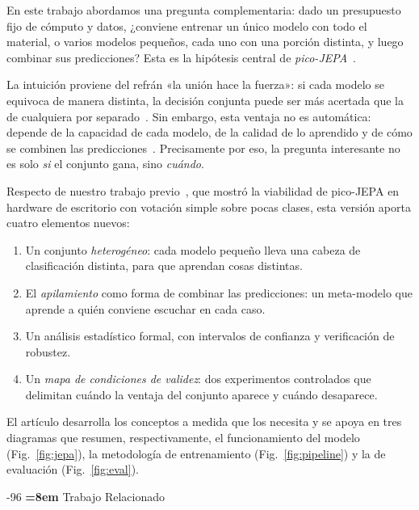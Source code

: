 \documentclass[runningheads]{llncs}
\makeatletter
\renewcommand\section{\@startsection{section}{1}{\z@}%
   {-9\p@ \@plus -2\p@ \@minus -2\p@}{6\p@ \@plus 2\p@ \@minus 2\p@}%
   {\normalfont\large\bfseries\boldmath\rightskip=\z@ \@plus 8em\pretolerance=10000 }}
\makeatother
\begin{document}
En este trabajo abordamos una pregunta complementaria: dado un presupuesto fijo
de cómputo y datos, ¿conviene entrenar un único modelo con todo el material, o
varios modelos pequeños, cada uno con una porción distinta, y luego combinar sus
predicciones? Esta es la hipótesis central de
\emph{pico-JEPA}~\cite{rostagno2025pico}.

La intuición proviene del refrán «la unión hace la fuerza»: si cada modelo se
equivoca de manera distinta, la decisión conjunta puede ser más acertada que la
de cualquiera por
separado~\cite{dietterich2000ensemble,lakshminarayanan2017simple}. Sin embargo,
esta ventaja no es automática: depende de la capacidad de cada modelo, de la
calidad de lo aprendido y de cómo se combinen las
predicciones~\cite{wenzel2020hyperparameter}. Precisamente por eso, la pregunta
interesante no es solo \emph{si} el conjunto gana, sino \emph{cuándo}.

Respecto de nuestro trabajo previo~\cite{rostagno2025pico}, que mostró la
viabilidad de pico-JEPA en hardware de escritorio con votación simple sobre
pocas clases, esta versión aporta cuatro elementos nuevos:
\begin{enumerate}
  \item Un conjunto \emph{heterogéneo}: cada modelo pequeño lleva una cabeza de
        clasificación distinta, para que aprendan cosas distintas.
  \item El \emph{apilamiento} como forma de combinar las predicciones: un
        meta-modelo que aprende a quién conviene escuchar en cada caso.
  \item Un análisis estadístico formal, con intervalos de confianza y
        verificación de robustez.
  \item Un \emph{mapa de condiciones de validez}: dos experimentos controlados
        que delimitan cuándo la ventaja del conjunto aparece y cuándo
        desaparece.
\end{enumerate}

El artículo desarrolla los conceptos a medida que los necesita y se apoya en
tres diagramas que resumen, respectivamente, el funcionamiento del modelo
(Fig.~\ref{fig:jepa}), la metodología de entrenamiento (Fig.~\ref{fig:pipeline})
y la de evaluación (Fig.~\ref{fig:eval}).

\section{Trabajo Relacionado}
\end{document}
